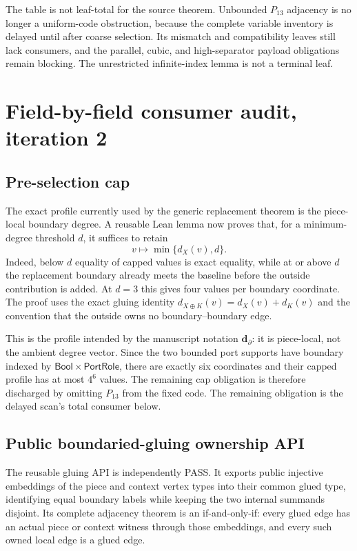 \documentclass[11pt]{article}
\begin{document}
The table is not leaf-total for the source theorem.  Unbounded $P_{13}$
adjacency is no longer a uniform-code obstruction, because the complete
variable inventory is delayed until after coarse selection.  Its mismatch and
compatibility leaves still lack consumers, and the parallel, cubic, and
high-separator payload obligations remain blocking.  The
unrestricted infinite-index lemma is not a terminal leaf.

\section{Field-by-field consumer audit, iteration 2}

\subsection*{Pre-selection cap}
The exact profile currently used by the generic replacement theorem is the
piece-local boundary degree.  A reusable Lean lemma now proves that, for a
minimum-degree threshold $d$, it suffices to retain
\[
  v\longmapsto \min\{d_X(v),d\}.
\]
Indeed, below $d$ equality of capped values is exact equality, while at or
above $d$ the replacement boundary already meets the baseline before the
outside contribution is added.  At $d=3$ this gives four values per boundary
coordinate.  The proof uses the exact gluing identity
\(d_{X\oplus K}(v)=d_X(v)+d_K(v)\) and the convention that the outside owns no
boundary--boundary edge.

This is the profile intended by the manuscript notation
$\mathbf d_\partial$: it is piece-local, not the ambient degree vector.  Since
the two bounded port supports have boundary indexed by
$\mathsf{Bool}\times\mathsf{PortRole}$, there are exactly six coordinates and
their capped profile has at most $4^6$ values.  The remaining cap obligation is
therefore discharged by omitting $P_{13}$ from the fixed code.  The remaining
obligation is the delayed scan's total consumer below.

\subsection*{Public boundaried-gluing ownership API}
The reusable gluing API is independently PASS.  It exports public injective
embeddings of the piece and context vertex types into their common glued type,
identifying equal boundary labels while keeping the two internal summands
disjoint.  Its complete adjacency theorem is an if-and-only-if: every glued
edge has an actual piece or context witness through those embeddings, and
every such owned local edge is a glued edge.
\end{document}
